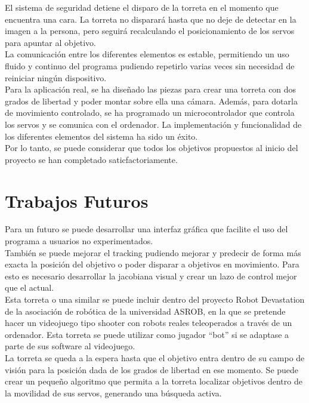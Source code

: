 El sistema de seguridad detiene el disparo de la torreta en el momento que encuentra una cara. 
La torreta no disparará hasta que no deje de detectar en la imagen a la persona, pero seguirá recalculando el posicionamiento de los servos para apuntar al objetivo.\\

La comunicación entre los diferentes elementos es estable, permitiendo un uso fluido y continuo del programa pudiendo repetirlo varias veces sin necesidad de reiniciar ningún dispositivo.\\

Para la aplicación real, se ha diseñado las piezas para crear una torreta con dos grados de libertad y poder montar sobre ella una cámara. Además, para dotarla de movimiento controlado, se ha programado un microcontrolador que controla los servos y se comunica con el ordenador. La implementación y funcionalidad de los diferentes elementos del sistema ha sido un éxito.\\

Por lo tanto, se puede considerar que todos los objetivos propuestos al inicio del proyecto se han completado saticfactoriamente.\\



\newpage


\section{Trabajos Futuros}
Para un futuro se puede desarrollar una interfaz gráfica que facilite el uso del programa a usuarios no experimentados.\\

También se puede mejorar el tracking pudiendo mejorar y predecir de forma más exacta la posición del objetivo o poder disparar a objetivos en movimiento. Para esto es necesario desarrollar la jacobiana visual y crear un lazo de control mejor que el actual.\\

Esta torreta o una similar se puede incluir dentro del proyecto Robot Devastation de la asociación de robótica de la universidad ASROB, en la que se pretende hacer un videojuego tipo shooter con robots reales teleoperados a través de un ordenador. Esta torreta se puede utilizar como jugador “bot” si se adaptase a parte de sus software al videojuego.\\

La torreta se queda a la espera hasta que el objetivo entra dentro de su campo de visión para la posición dada de los grados de libertad en ese momento. Se puede crear un pequeño algoritmo que permita a la torreta localizar objetivos dentro de la movilidad de sus servos, generando una búsqueda activa.\\
